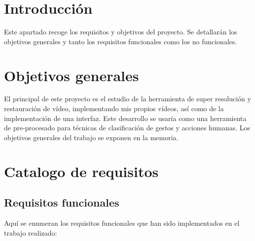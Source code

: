 
\section{Introducción}
Este apartado recoge los requisitos y objetivos del proyecto. Se detallarán los objetivos generales y tanto los requisitos funcionales como los no funcionales.

\section{Objetivos generales}

El principal de este proyecto es el estudio de la herramienta de super resolución y restauración de vídeo, implementando mis propios vídeos, así como de la implementación de una interfaz. Este desarrollo se usaría como una herramienta de pre-procesado para técnicas de clasificación de gestos y acciones humanas.
Los objetivos generales del trabajo se exponen en la memoria.

\section{Catalogo de requisitos}

\subsection{Requisitos funcionales}
Aquí se enumeran los requisitos funcionales que han sido implementados en el trabajo realizado:

